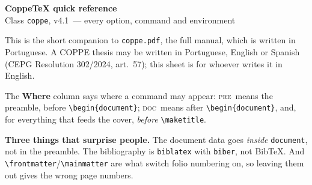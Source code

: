 \documentclass[a4paper,10pt]{article}
\newcommand\coppeversion{v4.1}
\newcommand\pre{\textsc{pre}}
\newcommand\doc{\textsc{doc}}
\begin{document}
\begin{center}
  {\Large\bfseries CoppeTeX quick reference}\\[2pt]
  {\normalsize Class \texttt{coppe}, \coppeversion\ --- every option, command and
  environment}\\[6pt]
  \begin{minipage}{0.86\textwidth}\small
  This is the short companion to \texttt{coppe.pdf}, the full manual, which is
  written in Portuguese. A COPPE thesis may be written in Portuguese, English or
  Spanish (CEPG Resolution 302/2024, art.~57); this sheet is for whoever writes
  it in English.

  \medskip
  The \textbf{Where} column says where a command may appear:
  \pre\ means the preamble, before \verb|\begin{document}|;
  \doc\ means after \verb|\begin{document}|, and, for everything that feeds the
  cover, \emph{before} \verb|\maketitle|.

  \medskip
  \textbf{Three things that surprise people.} The document data goes
  \emph{inside} \texttt{document}, not in the preamble. The bibliography is
  \texttt{biblatex} with \texttt{biber}, not Bib\TeX. And
  \verb|\frontmatter|/\verb|\mainmatter| are what switch folio numbering on, so
  leaving them out gives the wrong page numbers.
  \end{minipage}
\end{center}

\vspace{4pt}
\end{document}
